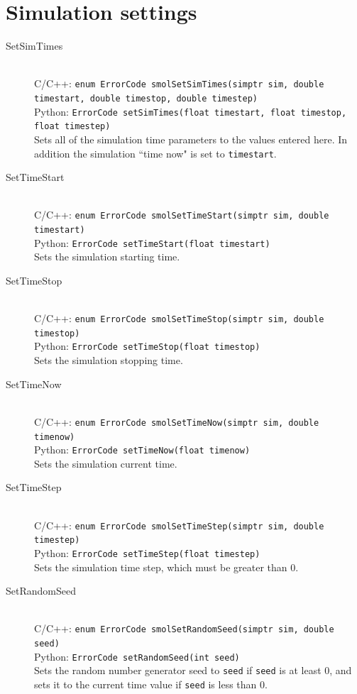 \documentclass {scrbook}
\newcommand {\ttt} {\texttt}
\begin{document}
\section{Simulation settings}

\begin{description}

\item[SetSimTimes]
\hfill \\
C/C++: \ttt{enum ErrorCode smolSetSimTimes(simptr sim, double timestart, double timestop, double timestep)}\\
Python: \ttt{ErrorCode setSimTimes(float timestart, float timestop, float timestep)}\\
Sets all of the simulation time parameters to the values entered here. In addition the simulation ``time now" is set to \ttt{timestart}.

\item[SetTimeStart]
\hfill \\
C/C++: \ttt{enum ErrorCode smolSetTimeStart(simptr sim, double timestart)}\\
Python: \ttt{ErrorCode setTimeStart(float timestart)}\\
Sets the simulation starting time.

\item[SetTimeStop]
\hfill \\
C/C++: \ttt{enum ErrorCode smolSetTimeStop(simptr sim, double timestop)}\\
Python: \ttt{ErrorCode setTimeStop(float timestop)}\\
Sets the simulation stopping time.

\item[SetTimeNow]
\hfill \\
C/C++: \ttt{enum ErrorCode smolSetTimeNow(simptr sim, double timenow)}\\
Python: \ttt{ErrorCode setTimeNow(float timenow)}\\
Sets the simulation current time.

\item[SetTimeStep]
\hfill \\
C/C++: \ttt{enum ErrorCode smolSetTimeStep(simptr sim, double timestep)}\\
Python: \ttt{ErrorCode setTimeStep(float timestep)}\\
Sets the simulation time step, which must be greater than 0.

\item[SetRandomSeed]
\hfill \\
C/C++: \ttt{enum ErrorCode smolSetRandomSeed(simptr sim, double seed)}\\
Python: \ttt{ErrorCode setRandomSeed(int seed)}\\
Sets the random number generator seed to \ttt{seed} if \ttt{seed} is at least 0, and sets it to the current time value if \ttt{seed} is less than 0.


\end{description}
\end{document}
